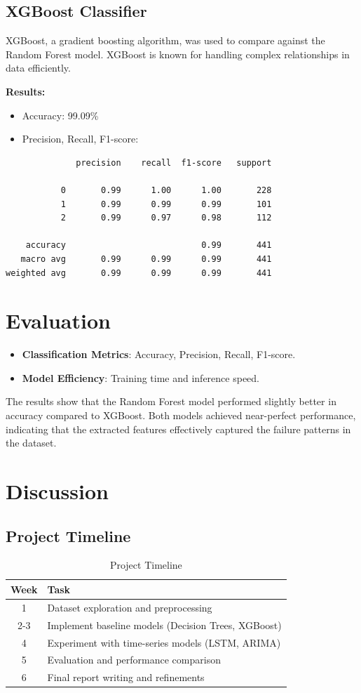 \documentclass[sigconf]{acmart}
\begin{document}
\subsection{XGBoost Classifier}
XGBoost, a gradient boosting algorithm, was used to compare against the Random Forest model. XGBoost is known for handling complex relationships in data efficiently.

\textbf{Results:}
\begin{itemize}
    \item Accuracy: 99.09\%
    \item Precision, Recall, F1-score:
\end{itemize}
\begin{verbatim}
              precision    recall  f1-score   support

           0       0.99      1.00      1.00       228
           1       0.99      0.99      0.99       101
           2       0.99      0.97      0.98       112

    accuracy                           0.99       441
   macro avg       0.99      0.99      0.99       441
weighted avg       0.99      0.99      0.99       441
\end{verbatim}

\section{Evaluation}
\begin{itemize}
    \item \textbf{Classification Metrics}: Accuracy, Precision, Recall, F1-score.
    \item \textbf{Model Efficiency}: Training time and inference speed.
\end{itemize}

The results show that the Random Forest model performed slightly better in accuracy compared to XGBoost. Both models achieved near-perfect performance, indicating that the extracted features effectively captured the failure patterns in the dataset.

\section{Discussion}
\subsection{Project Timeline}
\begin{table}[h]
    \centering
    \begin{tabular}{|c|l|}
    \hline
    Week & Task \\
    \hline
    1 & Dataset exploration and preprocessing \\
    2-3 & Implement baseline models (Decision Trees, XGBoost) \\
    4 & Experiment with time-series models (LSTM, ARIMA) \\
    5 & Evaluation and performance comparison \\
    6 & Final report writing and refinements \\
    \hline
    \end{tabular}
    \caption{Project Timeline}
\end{table}
\end{document}
